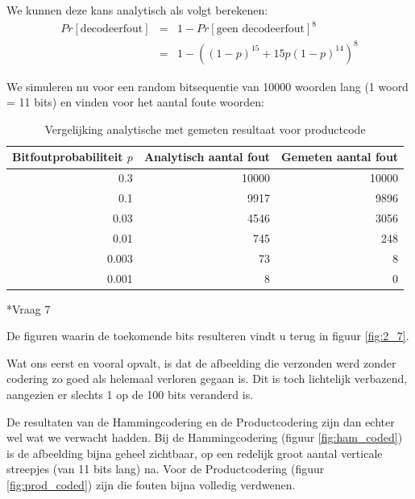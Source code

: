 \documentclass[]{article}
\begin{document}
\begin{section}
\begin{subsection}
        We kunnen deze kans analytisch als volgt berekenen:
        \begin{eqnarray*}
            Pr[\text{decodeerfout}]
                &=& 1 - Pr[\text{geen decodeerfout}]^8 \\
                &=& 1 - ((1-p)^{15} + 15p(1-p)^{14})^8
        \end{eqnarray*}

        We simuleren nu voor een random bitsequentie van 10000 woorden
        lang (1 woord = 11 bits) en vinden voor het aantal foute
        woorden:
        \begin{table}[htpb]
            \centering
            \begin{tabular}{r|r|r}
                Bitfoutprobabiliteit $p$ &
                Analytisch aantal fout &
                Gemeten aantal fout \\
                \hline
                0.3   & 10000 & 10000 \\
                0.1   &  9917 &  9896 \\
                0.03  &  4546 &  3056 \\
                0.01  &   745 &   248 \\
                0.003 &    73 &     8 \\
                0.001 &     8 &     0
            \end{tabular}
            \caption{Vergelijking analytische met gemeten resultaat
            voor productcode}
        \end{table}

    \end{subsection}

    \begin{subsection}*{Vraag 7} %

        De figuren waarin de toekomende bits resulteren vindt u terug
        in figuur \ref{fig:2_7}.

        Wat ons eerst en vooral opvalt, is dat de afbeelding die
        verzonden werd zonder codering zo goed als helemaal verloren
        gegaan is. Dit is toch lichtelijk verbazend, aangezien er
        slechts 1 op de 100 bits veranderd is.

        De resultaten van de Hammingcodering en de Productcodering zijn
        dan echter wel wat we verwacht hadden. Bij de Hammingcodering
        (figuur \ref{fig:ham_coded}) is de afbeelding bijna geheel
        zichtbaar, op een redelijk groot aantal verticale streepjes
        (van 11 bits lang) na. Voor de Productcodering (figuur
        \ref{fig:prod_coded}) zijn die fouten bijna volledig verdwenen.


\end{subsection}
\end{section}
\end{document}
